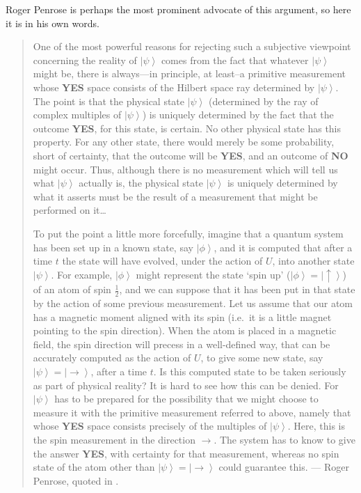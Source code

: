 \documentclass[DIV=calc,paper=a4,fontsize=11pt,twocolumn]{scrartcl} %
\theoremstyle{definition}
\theoremstyle{plain}
\newcommand{\Ket}[1]{\ensuremath{\left \vert #1 \right \rangle}}
\begin{document}
Roger Penrose is perhaps the most prominent advocate of this argument,
so here it is in his own words.

\begin{quotation}
One of the most powerful reasons for rejecting such a subjective
viewpoint concerning the reality of $\Ket{\psi}$ comes from the fact
that whatever $\Ket{\psi}$ might be, there is always---in principle,
at least--a primitive measurement whose \textbf{YES} space consists
of the Hilbert space ray determined by $\Ket{\psi}$. The point is
that the physical state $\Ket{\psi}$ (determined by the ray of
complex multiples of $\Ket{\psi}$) is uniquely determined by the
fact that the outcome \textbf{YES}, for this state, is certain. No
other physical state has this property. For any other state, there
would merely be some probability, short of certainty, that the
outcome will be \textbf{YES}, and an outcome of \textbf{NO} might
occur. Thus, although there is no measurement which will tell us
what $\Ket{\psi}$ actually is, the physical state $\Ket{\psi}$ is
uniquely determined by what it asserts must be the result of a
measurement that might be performed on it\ldots

To put the point a little more forcefully, imagine that a quantum
system has been set up in a known state, say $\Ket{\phi}$, and it is
computed that after a time $t$ the state will have evolved, under
the action of $U$, into another state $\Ket{\psi}$. For example,
$\Ket{\phi}$ might represent the state `spin up' ($\Ket{\phi} =
\Ket{\uparrow}$) of an atom of spin $\frac{1}{2}$, and we can
suppose that it has been put in that state by the action of some
previous measurement. Let us assume that our atom has a magnetic
moment aligned with its spin (i.e.\ it is a little magnet pointing
to the spin direction).  When the atom is placed in a magnetic
field, the spin direction will precess in a well-defined way, that
can be accurately computed as the action of $U$, to give some new
state, say $\Ket{\psi} = \Ket{\rightarrow}$, after a time $t$. Is
this computed state to be taken seriously as part of physical
reality? It is hard to see how this can be denied. For $\Ket{\psi}$
has to be prepared for the possibility that we might choose to
measure it with the primitive measurement referred to above, namely
that whose \textbf{YES} space consists precisely of the multiples of
$\Ket{\psi}$. Here, this is the spin measurement in the direction
$\rightarrow$. The system has to know to give the answer
\textbf{YES}, with certainty for that measurement, whereas no spin
state of the atom other than $\Ket{\psi} = \Ket{\rightarrow}$ could
guarantee this. --- Roger Penrose, quoted in \cite{Fuchs2011}.
\end{quotation}
\end{document}
